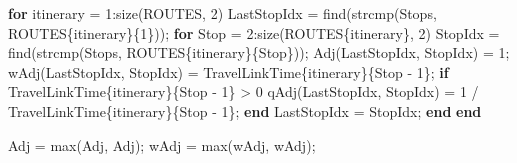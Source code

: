 \documentclass[
  letterpaper,
  DIV=11,
  numbers=noendperiod]{scrartcl}
\newenvironment{Shaded}{\begin{snugshade}}{\end{snugshade}}
\newcommand{\FloatTok}[1]{\textcolor[rgb]{0.68,0.00,0.00}{#1}}
\newcommand{\KeywordTok}[1]{\textcolor[rgb]{0.00,0.23,0.31}{\textbf{#1}}}
\newcommand{\NormalTok}[1]{\textcolor[rgb]{0.00,0.23,0.31}{#1}}
\newcommand{\OperatorTok}[1]{\textcolor[rgb]{0.37,0.37,0.37}{#1}}
\newcommand{\VariableTok}[1]{\textcolor[rgb]{0.07,0.07,0.07}{#1}}
\begin{document}
\begin{Shaded}
\begin{Highlighting}[]
    \KeywordTok{for} \VariableTok{itinerary} \OperatorTok{=} \FloatTok{1}\OperatorTok{:}\VariableTok{size}\NormalTok{(}\VariableTok{ROUTES}\OperatorTok{,} \FloatTok{2}\NormalTok{)}
        \VariableTok{LastStopIdx} \OperatorTok{=} \VariableTok{find}\NormalTok{(}\VariableTok{strcmp}\NormalTok{(}\VariableTok{Stops}\OperatorTok{,} \VariableTok{ROUTES}\NormalTok{\{}\VariableTok{itinerary}\NormalTok{\}\{}\FloatTok{1}\NormalTok{\}))}\OperatorTok{;}
        \KeywordTok{for} \VariableTok{Stop} \OperatorTok{=} \FloatTok{2}\OperatorTok{:}\VariableTok{size}\NormalTok{(}\VariableTok{ROUTES}\NormalTok{\{}\VariableTok{itinerary}\NormalTok{\}}\OperatorTok{,} \FloatTok{2}\NormalTok{)}
            \VariableTok{StopIdx} \OperatorTok{=} \VariableTok{find}\NormalTok{(}\VariableTok{strcmp}\NormalTok{(}\VariableTok{Stops}\OperatorTok{,} \VariableTok{ROUTES}\NormalTok{\{}\VariableTok{itinerary}\NormalTok{\}\{}\VariableTok{Stop}\NormalTok{\}))}\OperatorTok{;}
            \VariableTok{Adj}\NormalTok{(}\VariableTok{LastStopIdx}\OperatorTok{,} \VariableTok{StopIdx}\NormalTok{) }\OperatorTok{=} \FloatTok{1}\OperatorTok{;}
            \VariableTok{wAdj}\NormalTok{(}\VariableTok{LastStopIdx}\OperatorTok{,} \VariableTok{StopIdx}\NormalTok{) }\OperatorTok{=} \VariableTok{TravelLinkTime}\NormalTok{\{}\VariableTok{itinerary}\NormalTok{\}\{}\VariableTok{Stop} \OperatorTok{{-}} \FloatTok{1}\NormalTok{\}}\OperatorTok{;}
            \KeywordTok{if} \VariableTok{TravelLinkTime}\NormalTok{\{}\VariableTok{itinerary}\NormalTok{\}\{}\VariableTok{Stop} \OperatorTok{{-}} \FloatTok{1}\NormalTok{\} }\OperatorTok{\textgreater{}} \FloatTok{0}
                \VariableTok{qAdj}\NormalTok{(}\VariableTok{LastStopIdx}\OperatorTok{,} \VariableTok{StopIdx}\NormalTok{) }\OperatorTok{=} \FloatTok{1} \OperatorTok{/} \VariableTok{TravelLinkTime}\NormalTok{\{}\VariableTok{itinerary}\NormalTok{\}\{}\VariableTok{Stop} \OperatorTok{{-}} \FloatTok{1}\NormalTok{\}}\OperatorTok{;}
            \KeywordTok{end}
            \VariableTok{LastStopIdx} \OperatorTok{=} \VariableTok{StopIdx}\OperatorTok{;}
        \KeywordTok{end}
    \KeywordTok{end}

    \VariableTok{Adj} \OperatorTok{=} \VariableTok{max}\NormalTok{(}\VariableTok{Adj}\OperatorTok{,} \VariableTok{Adj}\OperatorTok{\textquotesingle{}}\NormalTok{)}\OperatorTok{;}
    \VariableTok{wAdj} \OperatorTok{=} \VariableTok{max}\NormalTok{(}\VariableTok{wAdj}\OperatorTok{,} \VariableTok{wAdj}\OperatorTok{\textquotesingle{}}\NormalTok{)}\OperatorTok{;}


\end{Highlighting}
\end{Shaded}
\end{document}
